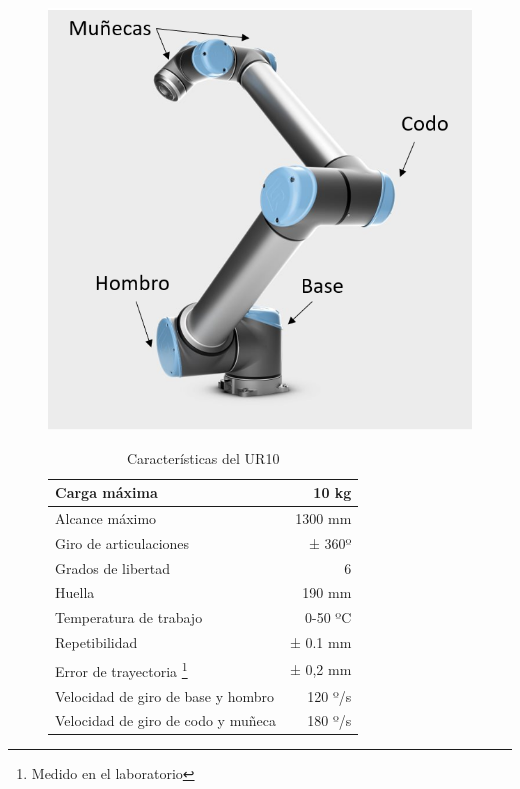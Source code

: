 \begin{table}[h!]
    \begin{subfigure}[h!]{0.45\textwidth}
        \includegraphics[scale=0.5]{figuras/articulaciones_UR.png}
        \label{fig:articulaciones_UR}
    \end{subfigure}
    \hfill
    \begin{subfigure}[h!]{0.7\textwidth}
        \begin{tabular}{|l|r|}
            \hline
            Carga máxima & 10 kg \\
            \hline
            Alcance máximo & 1300 mm \\
            \hline
            Giro de articulaciones & ± 360º \\
            \hline
            Grados de libertad & 6 \\
            \hline
            Huella & 190 mm \\
            \hline
            Temperatura de trabajo & 0-50 ºC \\
            \hline
            Repetibilidad & ± 0.1 mm \\
            \hline
            Error de trayectoria \footnote{Medido en el laboratorio} & ± 0,2 mm \\
            \hline
            Velocidad de giro de base y hombro & 120 º/s \\
            \hline
            Velocidad de giro de codo y muñeca & 180 º/s \\
            \hline
        \end{tabular}
        \label{tab:caracteristicas_UR_tabla}
    \end{subfigure}
    \caption{Características del UR10 \cite{UR_Technical_Specs}}
    \label{tab:caracteristicas_UR}
\end{table}


